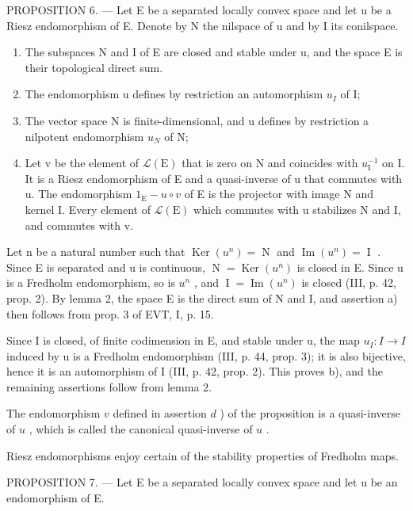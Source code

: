 PROPOSITION 6. --- Let E be a separated locally convex space and let u be a Riesz endomorphism of E. Denote by N the nilspace of u and by I its conilspace.

\begin{enumerate}
\def\labelenumi{\alph{enumi})}
\item
  The subspaces N and I of E are closed and stable under u, and the space E is their topological direct sum.
\item
  The endomorphism u defines by restriction an automorphism \(u_{I}\) of I;
\item
   The vector space N is finite-dimensional, and u defines by restriction a nilpotent endomorphism \(u_{N}\) of N;
\item
  Let v be the element of \(\mathcal{L}(\mathrm{E})\) that is zero on N and coincides with \(u_{\mathrm{I}}^{-1}\) on I. It is a Riesz endomorphism of E and a quasi-inverse of u that commutes with u. The endomorphism \(1_{\mathrm{E}} - u \circ v\) of E is the projector with image N and kernel I. Every element of \(\mathcal{L}(\mathrm{E})\) which commutes with u stabilizes N and I, and commutes with v.
\end{enumerate}

Let n be a natural number such that \(\operatorname{Ker}(u^{n}) = \operatorname{N}\) and \(\operatorname{Im}(u^{n}) = \operatorname{I}\) . Since E is separated and u is continuous, \(\operatorname{N} = \operatorname{Ker}(u^{n})\) is closed in E. Since u is a Fredholm endomorphism, so is \(u^{n}\) , and \(\operatorname{I} = \operatorname{Im}(u^{n})\) is closed (III, p. 42, prop. 2). By lemma 2, the space E is the direct sum of N and I, and assertion a) then follows from prop. 3 of EVT, I, p. 15.

Since I is closed, of finite codimension in E, and stable under u, the map \(u_{I}\colon I \to I\) induced by u is a Fredholm endomorphism (III, p. 44, prop. 3); it is also bijective, hence it is an automorphism of I (III, p. 42, prop. 2). This proves b), and the remaining assertions follow from lemma 2.

The endomorphism \(v\) defined in assertion \(d\) ) of the proposition is a quasi-inverse of \(u\) , which is called the canonical quasi-inverse of \(u\) .

Riesz endomorphisms enjoy certain of the stability properties of Fredholm maps.

PROPOSITION 7. — Let E be a separated locally convex space and let u be an endomorphism of E.

